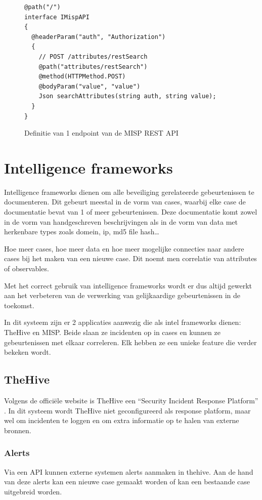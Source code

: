 \documentclass[a4paper,12pt]{report}
\begin{document}
\begin{figure}[H]
  \begin{lstlisting}
@path("/")
interface IMispAPI
{
  @headerParam("auth", "Authorization")
  {
    // POST /attributes/restSearch
    @path("attributes/restSearch")
    @method(HTTPMethod.POST)
    @bodyParam("value", "value")
    Json searchAttributes(string auth, string value);
  }
}
  \end{lstlisting}
  \caption{Definitie van 1 endpoint van de MISP REST API}
  \label{fig:vibe-rest-misp}
\end{figure}

\section{Intelligence frameworks}
Intelligence frameworks dienen om alle beveiliging gerelateerde gebeurtenissen te documenteren.
Dit gebeurt meestal in de vorm van cases, waarbij elke case de documentatie bevat van 1 of meer gebeurtenissen.
Deze documentatie komt zowel in de vorm van handgeschreven beschrijvingen als in de vorm van data met herkenbare types zoals domein, ip, md5 file hash\dots

Hoe meer cases, hoe meer data en hoe meer mogelijke connecties naar andere cases bij het maken van een nieuwe case.
Dit noemt men correlatie van attributes of observables.

Met het correct gebruik van intelligence frameworks wordt er dus altijd gewerkt aan het verbeteren van de verwerking van gelijkaardige gebeurtenissen in de toekomst.

In dit systeem zijn er 2 applicaties aanwezig die als intel frameworks dienen: TheHive en MISP.
Beide slaan ze incidenten op in cases en kunnen ze gebeurtenissen met elkaar correleren.
Elk hebben ze een unieke feature die verder bekeken wordt.

\subsection{TheHive}
Volgens de officiële website is TheHive een ``Security Incident Response Platform'' \autocite{thehive:home}.
In dit systeem wordt TheHive niet geconfigureerd als response platform, maar wel om incidenten te loggen en om extra informatie op te halen van externe bronnen.

\subsubsection{Alerts}
Via een API kunnen externe systemen alerts aanmaken in thehive.
Aan de hand van deze alerts kan een nieuwe case gemaakt worden of kan een bestaande case uitgebreid worden.
\end{document}
